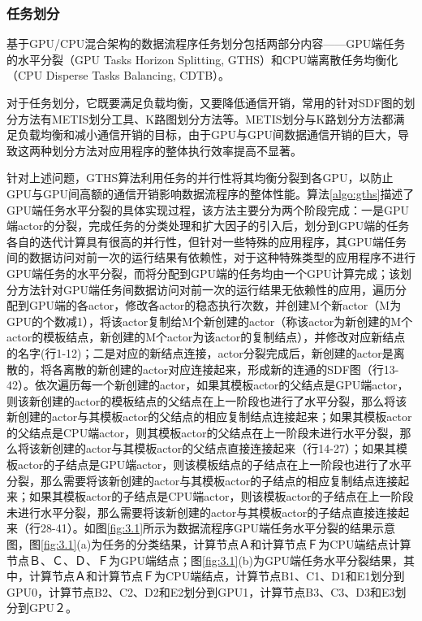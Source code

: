 \subsubsection{任务划分}
基于GPU/CPU混合架构的数据流程序任务划分包括两部分内容——GPU端任务的水平分裂（GPU Tasks Horizon Splitting, GTHS）和CPU端离散任务均衡化（CPU Disperse Tasks Balancing, CDTB）。

对于任务划分，它既要满足负载均衡，又要降低通信开销，常用的针对SDF图的划分方法有METIS划分工具、K路图划分方法等。METIS划分与K路划分方法都满足负载均衡和减小通信开销的目标，由于GPU与GPU间数据通信开销的巨大，导致这两种划分方法对应用程序的整体执行效率提高不显著。

针对上述问题，GTHS算法利用任务的并行性将其均衡分裂到各GPU，以防止GPU与GPU间高额的通信开销影响数据流程序的整体性能。算法\ref{algo:gths}描述了GPU端任务水平分裂的具体实现过程，该方法主要分为两个阶段完成：一是GPU端actor的分裂，完成任务的分类处理和扩大因子的引入后，划分到GPU端的任务各自的迭代计算具有很高的并行性，但针对一些特殊的应用程序，其GPU端任务间的数据访问对前一次的运行结果有依赖性，对于这种特殊类型的应用程序不进行GPU端任务的水平分裂，而将分配到GPU端的任务均由一个GPU计算完成；该划分方法针对GPU端任务间数据访问对前一次的运行结果无依赖性的应用，遍历分配到GPU端的各actor，修改各actor的稳态执行次数，并创建M个新actor（M为GPU的个数减1），将该actor复制给M个新创建的actor（称该actor为新创建的M个actor的模板结点，新创建的M个actor为该actor的复制结点），并修改对应新结点的名字(行1-12)；二是对应的新结点连接，actor分裂完成后，新创建的actor是离散的，将各离散的新创建的actor对应连接起来，形成新的连通的SDF图（行13-42）。依次遍历每一个新创建的actor，如果其模板actor的父结点是GPU端actor，则该新创建的actor的模板结点的父结点在上一阶段也进行了水平分裂，那么将该新创建的actor与其模板actor的父结点的相应复制结点连接起来；如果其模板actor的父结点是CPU端actor，则其模板actor的父结点在上一阶段未进行水平分裂，那么将该新创建的actor与其模板actor的父结点直接连接起来（行14-27）；如果其模板actor的子结点是GPU端actor，则该模板结点的子结点在上一阶段也进行了水平分裂，那么需要将该新创建的actor与其模板actor的子结点的相应复制结点连接起来；如果其模板actor的子结点是CPU端actor，则该模板actor的子结点在上一阶段未进行水平分裂，那么需要将该新创建的actor与其模板actor的子结点直接连接起来（行28-41）。如图\ref{fig:3.1}所示为数据流程序GPU端任务水平分裂的结果示意图，图\ref{fig:3.1}(a)为任务的分类结果，计算节点Ａ和计算节点Ｆ为CPU端结点计算节点Ｂ、Ｃ、Ｄ、Ｆ为GPU端结点；图\ref{fig:3.1}(b)为GPU端任务水平分裂结果，其中，计算节点Ａ和计算节点Ｆ为CPU端结点，计算节点B1、C1、D1和E1划分到GPU0，计算节点B2、C2、D2和E2划分到GPU1，计算节点B3、C3、D3和E3划分到GPU２。


